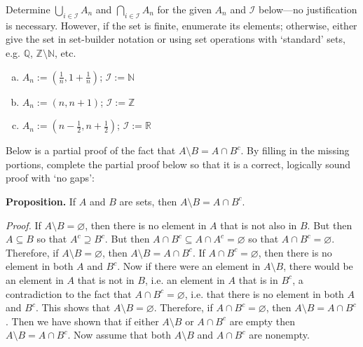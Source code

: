 \documentclass[11pt,letterpaper]{article}
\begin{document}
\newpage



 Determine $\displaystyle \bigcup_{i \in \mathcal{I}} A_n$ and $\displaystyle \bigcap_{i \in \mathcal{I}} A_n$ for the given $A_n$ and $\mathcal{I}$ below---no justification is necessary. However, if the set is finite, enumerate its elements; otherwise, either give the set in set-builder notation or using set operations with `standard' sets, e.g. $\mathbb{Q}$, $\mathbb{Z} \setminus \mathbb{N}$, etc. 
	\begin{enumerate}[(a)]
	\item $A_n:= \left( \frac{1}{n}, 1 + \frac{1}{n} \right)$; $\mathcal{I}:= \mathbb{N}$
	\item $A_n:= \left( n, n + 1 \right)$; $\mathcal{I}:= \mathbb{Z}$
	\item $A_n:= \left( n - \frac{1}{2}, n + \frac{1}{2} \right)$; $\mathcal{I}:= \mathbb{R}$
	\end{enumerate}



\newpage



 Below is a partial proof of the fact that $A \setminus B= A \cap B^c$. By filling in the missing portions, complete the partial proof below so that it is a correct, logically sound proof with `no gaps': \pspace

{\bfseries Proposition.} If $A$ and $B$ are sets, then $A \setminus B= A \cap B^c$. \pspace

{\itshape Proof.} If $A \setminus B= \varnothing$, then there is no element in $A$ that is not also in $B$. But then $A \subseteq B$ so that $A^c \supseteq B^c$. But then $A \cap B^c \subseteq A \cap A^c= \varnothing$ so that $A \cap B^c= \varnothing$. Therefore, if $A \setminus B= \varnothing$, then $A \setminus B= A \cap B^c$. If $A \cap B^c= \varnothing$, then there is no element in both $A$ and $B^c$. Now if there were an element in $A \setminus B$, there would be an element in $A$ that is not in $B$, i.e. an element in $A$ that is in $B^c$, a contradiction to the fact that $A \cap B^c= \varnothing$, i.e. that there is no element in both $A$ and $B^c$. This shows that $A \setminus B= \varnothing$. Therefore, if $A \cap B^c= \varnothing$, then $A \setminus B= A \cap B^c$. Then we have shown that if either $A \setminus B$ or $A \cap B^c$ are empty then $A \setminus B= A \cap B^c$. Now assume that both $A \setminus B$ and $A \cap B^c$ are nonempty. \pspace
\end{document}
